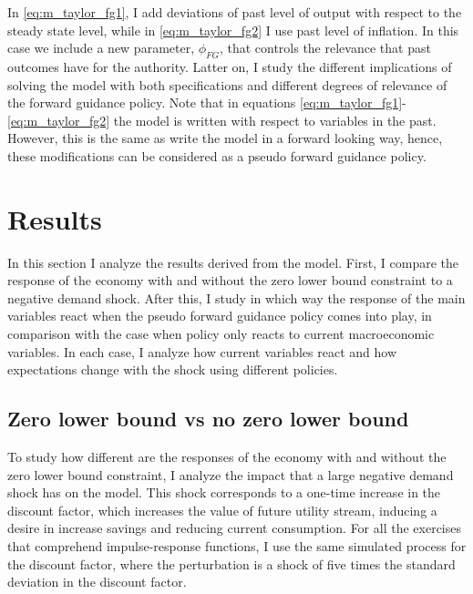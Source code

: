 \documentclass[12pt]{article}
\numberwithin{equation}{section}
\begin{document}
In \eqref{eq:m_taylor_fg1}, I add deviations of past level of output with respect to the steady state level, while in \eqref{eq:m_taylor_fg2} I use past level of inflation. In this case we include a new parameter, $\phi_{FG}$, that controls the relevance that past outcomes have for the authority. Latter on, I study the different implications of solving the model with both specifications and different degrees of relevance of the forward guidance policy. Note that in equations \eqref{eq:m_taylor_fg1}-\eqref{eq:m_taylor_fg2} the model is written with respect to variables in the past. However, this is the same as write the model in a forward looking way, hence, these modifications can be considered as a pseudo forward guidance policy.

\section{Results}\label{sec:results}

In this section I analyze the results derived from the model. First, I compare the response of the economy with and without the zero lower bound constraint to a negative demand shock. After this, I study in which way the response of the main variables react when the pseudo forward guidance policy comes into play, in comparison with the case when policy only reacts to current macroeconomic variables. In each case, I analyze how current variables react and how expectations change with the shock using different policies.

\subsection{Zero lower bound vs no zero lower bound}

To study how different are the responses of the economy with and without the zero lower bound constraint, I analyze the impact that a large negative demand shock has on the model. This shock corresponds to a one-time increase in the discount factor, which increases the value of future utility stream, inducing a desire in increase savings and reducing current consumption. For all the exercises that comprehend impulse-response functions, I use the same simulated process for the discount factor, where the perturbation is a shock of five times the standard deviation in the discount factor.
\end{document}
